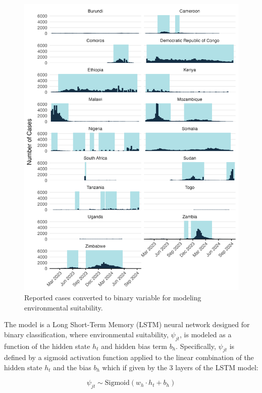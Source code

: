 \documentclass[
]{book}
\begin{document}
\begin{figure}

{\centering \includegraphics[width=1\linewidth]{figures/cases_binary} 

}

\caption{Reported cases converted to binary variable for modeling environmental suitability.}\label{fig:cases-binary}
\end{figure}

The model is a Long Short-Term Memory (LSTM) neural network designed for binary classification, where environmental suitability, \(\psi_{jt}\), is modeled as a function of the hidden state \(h_t\) and hidden bias term \(b_h\). Specifically, \(\psi_{jt}\) is defined by a sigmoid activation function applied to the linear combination of the hidden state \(h_t\) and the bias \(b_h\) which if given by the 3 layers of the LSTM model:

\begin{equation}
\psi_{jt} \sim \text{Sigmoid}(w_h \cdot h_t + b_h)
\label{eq:psi}
\end{equation}
\end{document}
